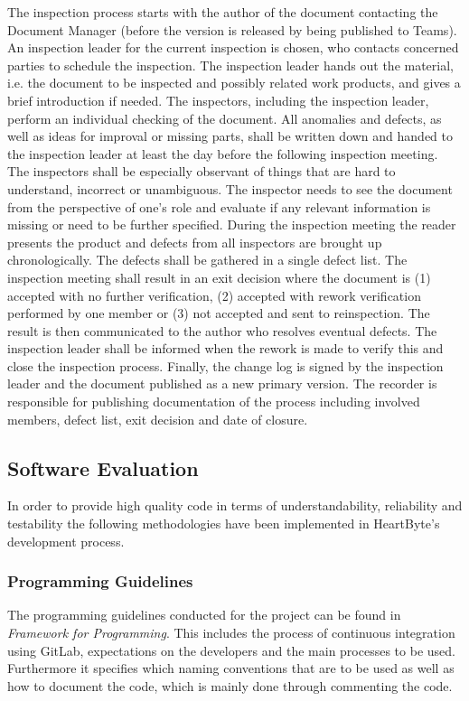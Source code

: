 \documentclass{article}
\begin{document}
	The inspection process starts with the author of the document contacting the Document Manager (before the version is released by being published to Teams). An inspection leader for the current inspection is chosen, who contacts concerned parties to schedule the inspection. The inspection leader hands out the material, i.e. the document to be inspected and possibly related work products, and gives a brief introduction if needed. The inspectors, including the inspection leader, perform an individual checking of the document. All anomalies and defects, as well as ideas for improval or missing parts, shall be written down and handed to the inspection leader at least the day before the following inspection meeting. The inspectors shall be especially observant of things that are hard to understand, incorrect or unambiguous. The inspector needs to see the document from the perspective of one's role and evaluate if any relevant information is missing or need to be further specified. During the inspection meeting the reader presents the product and defects from all inspectors are  brought up chronologically. The defects shall be gathered in a single defect list. The inspection meeting shall result in an exit decision where the document is (1) accepted with no further verification, (2) accepted with rework verification performed by one member or (3) not accepted and sent to reinspection. The result is then communicated to the author who resolves eventual defects. The inspection leader shall be informed when the rework is made to verify this and close the inspection process. Finally, the change log is signed by the inspection leader and the document published as a new primary version. The recorder is responsible for publishing documentation of the process including involved members, defect list, exit decision and date of closure.
	
	\subsection{Software Evaluation}	
	In order to provide high quality code in terms of understandability, reliability and testability the following methodologies have been implemented in HeartByte's development process.
	
	\subsubsection{Programming Guidelines}
	The programming guidelines conducted for the project can be found in \textit{Framework for Programming}. This includes the process of continuous integration using GitLab, expectations on the developers and the main processes to be used. Furthermore it specifies which naming conventions that are to be used as well as how to document the code, which is mainly done through commenting the code. 
	
\end{document}
